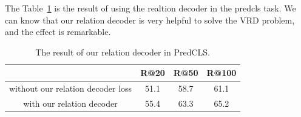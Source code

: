 The Table~\ref{tab:result_relation_decoder} is the result of using the realtion decoder in the predcls task. We can know that our relation decoder is very helpful to solve the VRD problem, and the effect is remarkable.
\begin{table}[!h]
	\centering
	\begin{tabular}{c|ccc}
		\bottomrule
		& R@20    & R@50    & R@100      \\ \hline
		without our relation decoder  loss & 51.1    &58.7      & 61.1    \\
		with our relation decoder     & 55.4       & 63.3       & 65.2       \\ \bottomrule
	\end{tabular}
	
	\caption[The result of our relation decoder in PredCLS]{The result of our relation decoder in PredCLS.}
	\label{tab:result_relation_decoder}
\end{table}


